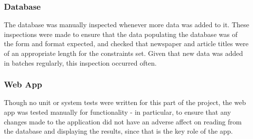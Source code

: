 \documentclass[11pt,a4paper]{article}
\begin{document}
\subsubsection{Database}
The database was manually inspected whenever more data was added to it. These inspections were made to ensure that the data populating the database was of the form and format expected, and checked that newspaper and article titles were of an appropriate length for the constraints set. Given that new data was added in batches regularly, this inspection occurred often.

\subsubsection{Web App}
Though no unit or system tests were written for this part of the project, the web app was tested manually for functionality - in particular, to ensure that any changes made to the application did not have an adverse affect on reading from the database and displaying the results, since that is the key role of the app. 
\end{document}

